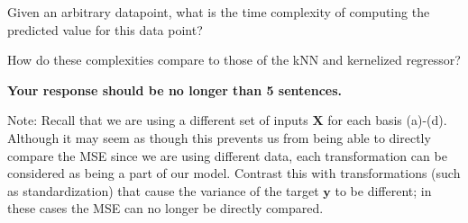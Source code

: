 \documentclass[submit]{harvardml}
\begin{document}
\begin{framed}
\begin{enumerate}
Given an arbitrary datapoint, what is the time complexity of computing the predicted value for this data point?

How do these complexities compare to those of the kNN and kernelized regressor?

\textbf{Your response should be no longer than 5 sentences.}

\end{enumerate}
Note:
Recall that we are using a 
different set of inputs $\mathbf{X}$ for each basis (a)-(d). 
Although it may seem as though this prevents us from being able 
to directly compare the MSE since we are using different data, 
each transformation can be considered as being a part of our model. 
Contrast this with transformations (such as standardization) that cause the variance
of the target $\mathbf{y}$ to be different; in these cases the
MSE can no longer be directly compared.

\end{framed}
\newpage
\end{document}
